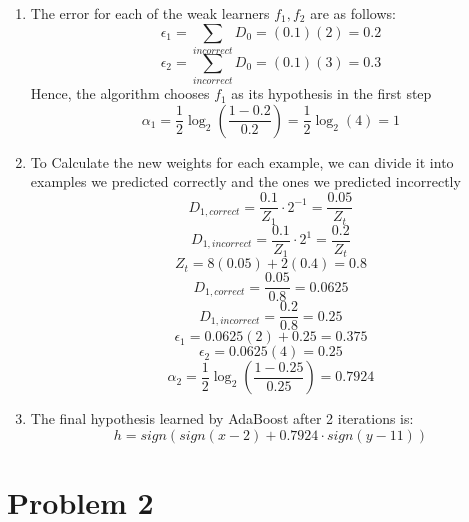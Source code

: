 \documentclass[11pt]{article}
\begin{document}
\begin{enumerate}
\item 
The error for each of the weak learners $f_1, f_2$ are as follows:
$$
\epsilon_1 = \sum_{incorrect} D_0 = (0.1)(2) = 0.2
$$
$$
\epsilon_2 = \sum_{incorrect} D_0 = (0.1)(3) = 0.3
$$
Hence, the algorithm chooses $f_1$ as its hypothesis in the first step
$$
\alpha_1 = \frac{1}{2} \log_2 \left( \frac{1 - 0.2}{0.2} \right) =  \frac{1}{2} \log_2 (4) = 1
$$

\item 
To Calculate the new weights for each example, we can divide it into examples we predicted correctly
and the ones we predicted incorrectly
$$
D_{1,correct} = \frac{0.1}{Z_1} \cdot 2^{-1} = \frac{0.05}{Z_t}
$$
$$
D_{1,incorrect} = \frac{0.1}{Z_1} \cdot 2^{1} = \frac{0.2}{Z_t}
$$
$$
Z_t = 8(0.05) + 2 (0.4) = 0.8
$$
$$
D_{1,correct} = \frac{0.05}{0.8} = 0.0625
$$
$$
D_{1,incorrect} = \frac{0.2}{0.8} = 0.25
$$
$$
\epsilon_1 = 0.0625(2) + 0.25 = 0.375
$$
$$
\epsilon_2 = 0.0625(4) = 0.25
$$
$$
\alpha_2 = \frac{1}{2} \log_2 \left( \frac{1 - 0.25}{0.25} \right) = 0.7924
$$
\item 
The final hypothesis learned by AdaBoost after 2 iterations is:
$$
h = sign(sign(x - 2) + 0.7924 \cdot sign( y - 11))
$$

\end{enumerate}

\newpage
\section{Problem 2}
\end{document}
